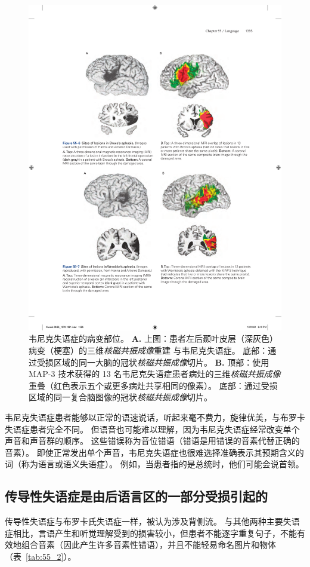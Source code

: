 \begin{figure}[htbp]
	\centering
	\includegraphics[width=0.75\linewidth]{chap55/fig_55_7}
	\caption{韦尼克失语症的病变部位。
		\textbf{A.} 上图：患者左后颞叶皮层（深灰色）病变（梗塞）的三维\textit{核磁共振成像}重建 与韦尼克失语症。
		底部：通过受损区域的同一大脑的冠状\textit{核磁共振成像}切片。
		\textbf{B.} 顶部：使用 MAP-3 技术获得的 13 名韦尼克失语症患者病灶的三维\textit{核磁共振成像}重叠（红色表示五个或更多病灶共享相同的像素）。
		底部：通过受损区域的同一复合脑图像的冠状\textit{核磁共振成像}切片。}
	\label{fig:55_7}
\end{figure}


韦尼克失语症患者能够以正常的语速说话，听起来毫不费力，旋律优美，与布罗卡失语症患者完全不同。
但语音也可能难以理解，因为韦尼克失语症经常改变单个声音和声音群的顺序。
这些错误称为音位错语（错语是用错误的音素代替正确的音素）。
即使正常发出单个声音，韦尼克失语症也很难选择准确表示其预期含义的词（称为语言或语义失语症）。
例如，当患者指的是总统时，他们可能会说首领。


\subsection{传导性失语症是由后语言区的一部分受损引起的}

传导性失语症与布罗卡氏失语症一样，被认为涉及背侧流。
与其他两种主要失语症相比，言语产生和听觉理解受到的损害较小，但患者不能逐字重复句子，不能有效地组合音素（因此产生许多音素性错语），并且不能轻易命名图片和物体（表~\ref{tab:55_2}）。


